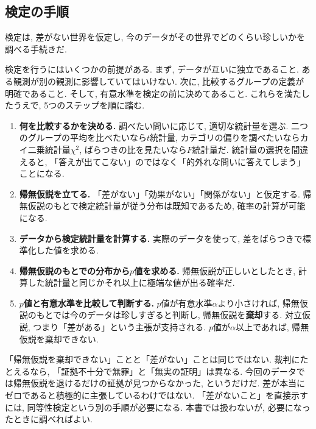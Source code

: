   \subsection{検定の手順}

    検定は, 差がない世界を仮定し, 今のデータがその世界でどのくらい珍しいかを調べる手続きだ.

    検定を行うにはいくつかの前提がある.
    まず, データが互いに独立であること. ある観測が別の観測に影響していてはいけない.
    次に, 比較するグループの定義が明確であること.
    そして, 有意水準を検定の前に決めてあること.
    これらを満たしたうえで, 5つのステップを順に踏む.

    \begin{enumerate}
      \item \textbf{何を比較するかを決める.}
        調べたい問いに応じて, 適切な統計量を選ぶ.
        二つのグループの平均を比べたいなら$t$統計量,
        カテゴリの偏りを調べたいならカイ二乗統計量$\chi^2$,
        ばらつきの比を見たいなら$F$統計量だ.
        統計量の選択を間違えると, 「答えが出てこない」のではなく「的外れな問いに答えてしまう」ことになる.

      \item \textbf{帰無仮説を立てる.}
        「差がない」「効果がない」「関係がない」と仮定する.
        帰無仮説のもとで検定統計量が従う分布は既知であるため, 確率の計算が可能になる.

      \item \textbf{データから検定統計量を計算する.}
        実際のデータを使って, 差をばらつきで標準化した値を求める.

      \item \textbf{帰無仮説のもとでの分布から$p$値を求める.}
        帰無仮説が正しいとしたとき, 計算した統計量と同じかそれ以上に極端な値が出る確率だ.

      \item \textbf{$p$値と有意水準を比較して判断する.}
        $p$値が有意水準$\alpha$より小さければ, 帰無仮説のもとでは今のデータは珍しすぎると判断し,
        帰無仮説を\textbf{棄却}する. 対立仮説, つまり「差がある」という主張が支持される.
        $p$値が$\alpha$以上であれば, 帰無仮説を棄却できない.
    \end{enumerate}

    「帰無仮説を棄却できない」ことと「差がない」ことは同じではない.
    裁判にたとえるなら, 「証拠不十分で無罪」と「無実の証明」は異なる.
    今回のデータでは帰無仮説を退けるだけの証拠が見つからなかった, というだけだ.
    差が本当にゼロであると積極的に主張しているわけではない.
    「差がないこと」を直接示すには, 同等性検定という別の手順が必要になる.
    本書では扱わないが, 必要になったときに調べればよい.

